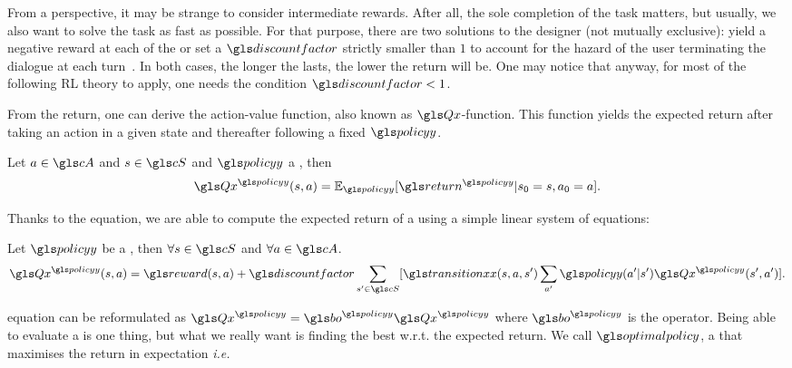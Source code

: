 From a   perspective, it may be strange to consider intermediate rewards. After all, the sole completion of the task matters, but usually, we also want to solve the task as fast as possible. For that purpose, there are two solutions to the  designer (not mutually exclusive): yield a negative reward at each  of the  or set a $\discountfactor$ strictly smaller than $1$ to account for the hazard of the user terminating the dialogue at each turn~\parencite{Fedus2019}. In both cases, the longer the  lasts, the lower the return will be. One may notice that anyway, for most of the following \gls{RL} theory to apply, one needs the condition $\discountfactor < 1$. %

From the return, one can derive the action-value function, also known as $\Q$-function. This function yields the expected return after taking an action in a given state and thereafter following a fixed  $\policy$.

\begin{definition}
    Let $a\in\cA$ and $s\in\cS$ and $\policy$ a , then
    \begin{align}
        \Q^{\policy}(s,a)=\mathbb{E}_{\policy} [\return^{\policy}|s_0=s,a_0=a].
    \end{align}
\end{definition}

Thanks to the  equation, we are able to compute the expected return of a  using a simple linear system of equations:

\begin{proposition}
    Let $\policy$ be a , then $\forall s\in\cS$ and $\forall a\in\cA$.
    \begin{align}
        \Q^{\policy}(s,a)=\reward(s,a) + \discountfactor\sum_{s'\in \cS}[\transition(s,a,s') \sum_{a'}\policy(a'|s')\Q^{\policy}(s',a')].
        \label{eq:bellman-evalutation}
    \end{align}
\end{proposition}

 equation can be reformulated as $\Q^{\policy}=\bo^{\policy}\Q^{\policy}$ where $\bo^{\policy}$ is the  operator. Being able to evaluate a  is one thing, but what we really want is finding the best  {w.r.t.} the expected return. We call   $\optimalpolicy$, a  that maximises the return in expectation \textit{i.e.}

